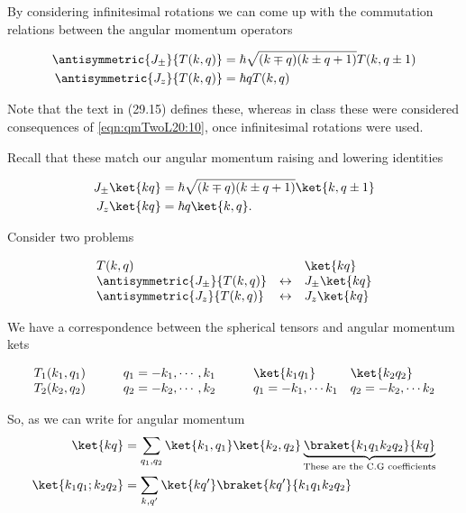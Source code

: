 By considering infinitesimal rotations we can come up with the commutation relations between the angular momentum operators

\begin{align}\label{eqn:qmTwoL20:50}
\antisymmetric{J_{\pm}}{T(k, q)} &= \hbar \sqrt{(k \mp q)(k \pm q + 1)} T(k, q \pm 1) \\
\antisymmetric{J_{z}}{T(k, q)} &= \hbar q T(k, q)
\end{align}

Note that the text in (29.15) defines these, whereas in class these were considered consequences of \ref{eqn:qmTwoL20:10}, once infinitesimal rotations were used.

Recall that these match our angular momentum raising and lowering identities

\begin{align}\label{eqn:qmTwoL20:50b}
J_{\pm} \ket{k q} &= \hbar \sqrt{(k \mp q)(k \pm q + 1)} \ket{k, q \pm 1} \\
J_{z} \ket{k q} &= \hbar q \ket{k, q}.
\end{align}

Consider two problems 

\begin{equation}\label{eqn:qmTwoL20:70}
\begin{array}{l l l}
T(k, q)						& & \ket{k q} \\
\antisymmetric{J_{\pm}}{T(k, q)} 		&\leftrightarrow &J_{\pm} \ket{k q} \\
\antisymmetric{J_{z}}{T(k, q)} 			&\leftrightarrow &J_{z} \ket{k q}
\end{array}
\end{equation}

We have a correspondence between the spherical tensors and angular momentum kets

\begin{equation}\label{eqn:qmTwoL20:330}
\begin{array}{l l l l}
T_1(k_1, q_1)&\qquad q_1 = -k_1, \cdots, k_1 		& \qquad \ket{k_1 q_1} 		& \ket{k_2 q_2} \\
T_2(k_2, q_2)&\qquad q_2 = -k_2, \cdots, k_2		& \qquad q_1 = -k_1, \cdots k_1 	& q_2 = -k_2, \cdots k_2 \\
\end{array}
\end{equation}

So, as we can write for angular momentum
\begin{align*}
\ket{kq} &= \sum_{q_1, q_2} 
\ket{k_1, q_1}
\ket{k_2, q_2}
\underbrace{\braket{ k_1 q_1 k_2 q_2 }{ k q}}_{\text{These are the C.G coefficients}}  \\
\ket{k_1 q_1 ; k_2 q_2}
&=
\sum_{k, q'}
\ket{k q'} \braket{ k q'}{ k_1 q_1 k_2 q_2 } 
\end{align*}

